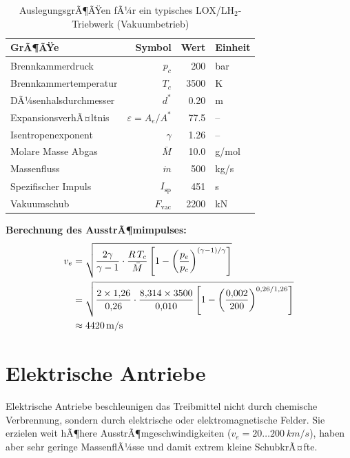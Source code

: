 ﻿\documentclass[12pt,a4paper]{article}
\newcommand{\Isp}{I_{\mathrm{sp}}}
\newcommand{\mdot}{\dot{m}}
\begin{document}
\begin{table}[H]
\centering
\caption{AuslegungsgrÃ¶ÃŸen fÃ¼r ein typisches LOX/LH$_2$-Triebwerk (Vakuumbetrieb)}
\label{tab:triebwerk}
\begin{tabular}{lrrl}
\toprule
\textbf{GrÃ¶ÃŸe} & \textbf{Symbol} & \textbf{Wert} & \textbf{Einheit}\\
\midrule
Brennkammerdruck        & $p_c$     & 200        & bar\\
Brennkammertemperatur   & $T_c$     & 3500       & K\\
DÃ¼senhalsdurchmesser    & $d^*$     & 0.20       & m\\
ExpansionsverhÃ¤ltnis    & $\varepsilon = A_e/A^*$ & 77.5 & --\\
Isentropenexponent      & $\gamma$  & 1.26       & --\\
Molare Masse Abgas      & $\bar{M}$ & 10.0       & g/mol\\
Massenfluss             & $\mdot$   & 500        & kg/s\\
Spezifischer Impuls     & $\Isp$    & 451        & s\\
Vakuumschub             & $F_{\mathrm{vac}}$ & 2200 & kN\\
\bottomrule
\end{tabular}
\end{table}

\textbf{Berechnung des AusstrÃ¶mimpulses:}
\begin{align}
  v_e &= \sqrt{\frac{2\gamma}{\gamma-1}\cdot\frac{R\,T_c}{\bar{M}}
    \left[1 - \left(\frac{p_e}{p_c}\right)^{(\gamma-1)/\gamma}\right]} \notag\\
  &= \sqrt{\frac{2\times1{,}26}{0{,}26}\cdot\frac{8{,}314\times3500}{0{,}010}
    \left[1 - \left(\frac{0{,}002}{200}\right)^{0{,}26/1{,}26}\right]} \notag\\
  &\approx \SI{4\,420}{m/s}
\end{align}

\section{Elektrische Antriebe}

Elektrische Antriebe beschleunigen das Treibmittel nicht durch chemische Verbrennung,
sondern durch elektrische oder elektromagnetische Felder. Sie erzielen weit hÃ¶here
AusstrÃ¶mgeschwindigkeiten ($v_e = 20\ldots\SI{200}{km/s}$), haben aber sehr geringe
MassenflÃ¼sse und damit extrem kleine SchubkrÃ¤fte.
\end{document}
